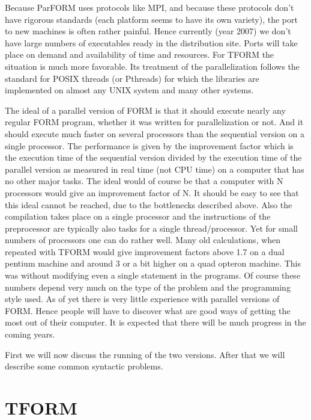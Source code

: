 Because ParFORM uses protocols like MPI, and because these 
protocols don't have rigorous standards (each platform seems to have its 
own variety), the port to new machines is often rather painful. Hence 
currently (year 2007) we don't have large numbers of executables ready in 
the distribution site. Ports will take place on demand and availability of 
time and resources. For TFORM the situation is much more favorable. Its 
treatment of the parallelization follows the standard for 
POSIX threads (or Pthreads) for which the libraries are 
implemented on almost any UNIX system and many other systems.

The ideal of a parallel version of FORM is that it should execute nearly 
any regular FORM program, whether it was written for parallelization or 
not. And it should execute much faster on several processors than the 
sequential version on a single processor. The performance is given by the 
improvement factor which is the execution time of the sequential version 
divided by the execution time of the parallel version as measured in real 
time (not CPU time) on a computer that has no other major tasks. The ideal 
would of course be that a computer with N processors would give an 
improvement factor of N. It should be easy to see that this ideal cannot be 
reached, due to the bottlenecks described above. Also the compilation takes 
place on a single processor and the instructions of the preprocessor are 
typically also tasks for a single thread/processor. Yet for small numbers 
of processors one can do rather well. Many old calculations, when repeated 
with TFORM would give improvement factors above 
1.7 on a dual pentium machine and around 3 or a bit higher 
on a quad opteron machine. This was without modifying even a 
single statement in the programs. Of course these numbers depend very much 
on the type of the problem and the programming style used. As of yet there 
is very little experience with parallel versions of FORM. Hence people will 
have to discover what are good ways of getting the most out of their 
computer. It is expected that there will be much progress in the coming 
years.

First we will now discuss the running of the two versions. After that we 
will describe some common syntactic problems.


\section{TFORM}
\label{tform}

